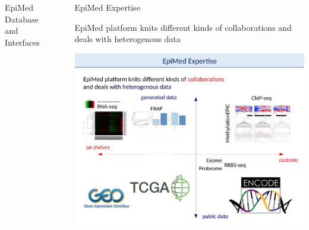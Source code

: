 \documentclass[final]{beamer}
\newlength{\sepwid}
\newlength{\twocolwid}
\begin{document}
\begin{frame}[t]
\begin{columns}[t]
\begin{column}{\twocolwid}
\begin{block}{EpiMed Database and Interfaces}
{}

\end{block}






\end{column} 





























\begin{column}{\sepwid}\end{column} %

\begin{column}{\twocolwid} %












\begin{block}{EpiMed Expertise}


EpiMed platform knits different kinds of collaborations
and deals with heterogenous data

{
\centering
\mbox{\includegraphics[trim = 0mm 0mm 0mm 43mm, clip, width=.9\linewidth]{figs/fig04}}

}
\end{block}
\end{column}
\end{columns}
\end{frame}
\end{document}

